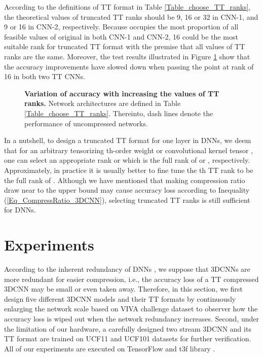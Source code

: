 \documentclass[a4paper,fleqn]{cas-dc}
\begin{document}
According to the definitions of TT format in Table \ref{Table_choose_TT_ranks}, the theoretical values of truncated TT ranks  should be 9, 16 or 32 in CNN-1, and 9 or 16 in CNN-2, respectively. Because  occupies the most proportion of all feasible values of original  in both CNN-1 and CNN-2, 16 could be the most suitable rank for truncated TT format with the premise that all values of TT ranks are the same. Moreover, the test results illustrated in Figure \ref{Fig_tt_ranks_test} show that the accuracy improvements have slowed down when passing the point at rank of 16 in both two TT CNNs.

\begin{figure}
\centering
{}
\caption{\textbf{Variation of accuracy with increasing the values of TT ranks.} Network architectures are defined in Table \ref{Table_choose_TT_ranks}. Thereinto, dash lines denote the performance of uncompressed networks.}
\label{Fig_tt_ranks_test}
\end{figure}

In a nutshell, to design a truncated TT format for one layer in DNNs, we deem that for an arbitrary tensorizing th-order weight or convolutional kernel tensor , one can select an appropriate rank  or  which is the full rank of  or , respectively. Approximately, in practice it is usually better to fine tune the th TT rank  to be the full rank of . Although we have mentioned that making compression ratio  draw near to the upper bound  may cause accuracy loss according to Inequality (\ref{Eq_CompressRatio_3DCNN}), selecting truncated TT ranks is still sufficient for DNNs. 




\section{Experiments}\label{sec:Exp}

According to the inherent redundancy of DNNs \citep{Denil_2013_Redundancy}, we suppose that 3DCNNs are more redundant for easier compression, i.e., the accuracy loss of a TT compressed 3DCNN may be small or even taken away. Therefore, in this section, we first design five different 3DCNN models and their TT formats by continuously enlarging the network scale based on VIVA challenge dataset to observer how the accuracy loss is wiped out when the network redundancy increases. Second, under the limitation of our hardware, a carefully designed two stream 3DCNN and its TT format are trained on UCF11 and UCF101 datasets for further verification. All of our experiments are executed on TensorFlow and t3f library \citep{Novikov_2018_t3f}.
\end{document}
